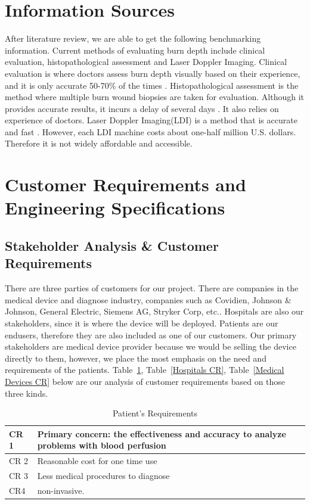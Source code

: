 \documentclass[paper=letter, fontsize=11pt]{scrartcl}
\numberwithin{equation}{section}		%
\numberwithin{figure}{section}			%
\numberwithin{table}{section}			%
\begin{document}
\section{Information Sources}


After literature review, we are able to get the following benchmarking information. Current methods of evaluating burn depth
include clinical evaluation, histopathological assessment and Laser Doppler Imaging. Clinical evaluation is where doctors
assess burn depth visually based on their experience, and it is only accurate 50-70\% of the times \cite{Renkielska}.
Histopathological assessment is the method where multiple burn wound biopsies are taken for evaluation. Although it provides
accurate results, it incurs a delay of several days \cite{Renkielska}. It also relies on experience of doctors. Laser Doppler Imaging(LDI) 
is a method that is accurate and fast \cite{Pape}. However, each LDI machine costs about one-half million U.S. dollars.
Therefore it is not widely affordable and accessible.

\pagebreak
\section{Customer Requirements and Engineering Specifications}
\subsection{Stakeholder Analysis \& Customer Requirements}
There are three parties of customers for our project. There are companies in the medical device and diagnose industry, companies such as Covidien, Johnson \& Johnson, General Electric, Siemens AG, Stryker Corp, etc.\cite{cres1}. Hospitals are also our stakeholders, since it is where the device will be deployed. Patients are our endusers, therefore they are also included as one of our customers.
Our primary stakeholders are medical device provider because we would be selling the device directly to them, however, we place the most emphasis on the need and requirements of the patients. Table~\ref{Patients CR}, Table~\ref{Hospitals CR}, Table~\ref{Medical Devices CR} below are our analysis of customer requirements based on those three kinds.
\begin {table}[H]
\centering
\begin{tabular}{l|p{12cm}}
CR 1 & Primary concern: the effectiveness and accuracy to analyze problems with blood perfusion \\ \hline
CR 2 & Reasonable cost for one time use \\ \hline
CR 3 & Less medical procedures to diagnose \\ \hline
CR4 & non-invasive.
\end{tabular}
\caption{Patient's Requirements}
\label{Patients CR}
\end{table}
\end{document}
